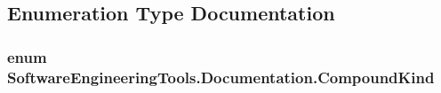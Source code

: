 \subsection{Enumeration Type Documentation}
\hypertarget{namespace_software_engineering_tools_1_1_documentation_aae490e51e07ef6e5540a2f2c04fccbb1}{
\subsubsection[{Compound\+Kind}]{\setlength{\rightskip}{0pt plus 5cm}enum {\bf Software\+Engineering\+Tools.\+Documentation.\+Compound\+Kind}}}\label{namespace_software_engineering_tools_1_1_documentation_aae490e51e07ef6e5540a2f2c04fccbb1}

